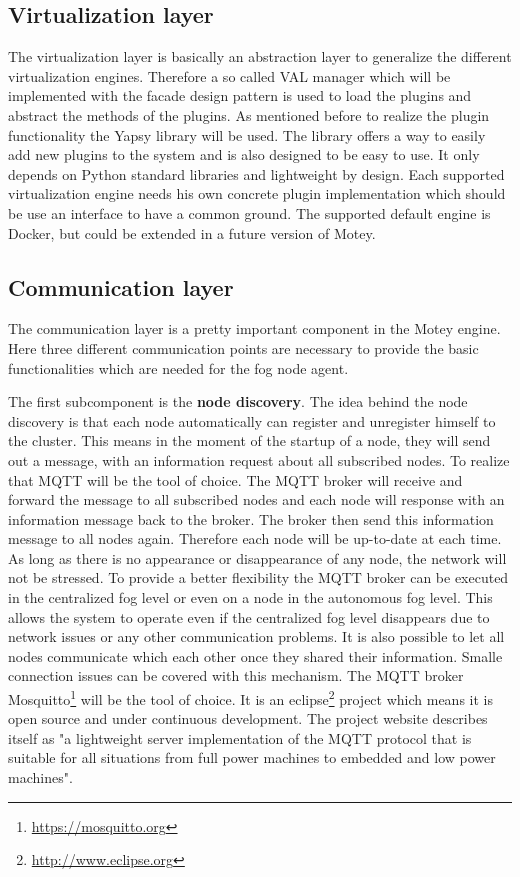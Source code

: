 \subsection{Virtualization layer}
The virtualization layer is basically an abstraction layer to generalize the different virtualization engines.
Therefore a so called \ac{VAL} manager which will be implemented with the facade design pattern is used to load the plugins and abstract the methods of the plugins.
As mentioned before to realize the plugin functionality the Yapsy library will be used.
The library offers a way to easily add new plugins to the system and is also designed to be easy to use.
It only depends on Python standard libraries and lightweight by design.
Each supported virtualization engine needs his own concrete plugin implementation which should be use an interface to have a common ground.
The supported default engine is Docker, but could be extended in a future version of Motey.


\subsection{Communication layer}
\label{subsection:CommunicationLayer}
The communication layer is a pretty important component in the Motey engine.
Here three different communication points are necessary to provide the basic functionalities which are needed for the fog node agent.

The first subcomponent is the \textbf{node discovery}.
The idea behind the node discovery is that each node automatically can register and unregister himself to the cluster.
This means in the moment of the startup of a node, they will send out a message, with an information request about all subscribed nodes.
To realize that \ac{MQTT} will be the tool of choice.
The \ac{MQTT} broker will receive and forward the message to all subscribed nodes and each node will response with an information message back to the broker.
The broker then send this information message to all nodes again.
Therefore each node will be up-to-date at each time.
As long as there is no appearance or disappearance of any node, the network will not be stressed.
To provide a better flexibility the \ac{MQTT} broker can be executed in the centralized fog level or even on a node in the autonomous fog level.
This allows the system to operate even if the centralized fog level disappears due to network issues or any other communication problems.
It is also possible to let all nodes communicate which each other once they shared their information.
Smalle connection issues can be covered with this mechanism.
The \ac{MQTT} broker Mosquitto\footnote{\url{https://mosquitto.org}} will be the tool of choice.
It is an eclipse\footnote{\url{http://www.eclipse.org}} project which means it is open source and under continuous development.
The project website describes itself as "a lightweight server implementation of the MQTT protocol that is suitable for all situations from full power machines to embedded and low power machines"\autocite{Eclipse:Mosquitto}.

